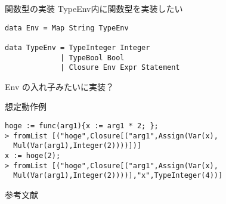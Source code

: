 \documentclass[uplatex,dvipdfmx,ja=standard]{beamer}
\begin{document}
\begin{frame}[fragile]{関数型の実装}
    TypeEnv内に関数型を実装したい
    \begin{verbatim}
data Env = Map String TypeEnv

data TypeEnv = TypeInteger Integer
             | TypeBool Bool
             | Closure Env Expr Statement
    \end{verbatim}
    Env の入れ子みたいに実装？

\end{frame}

\begin{frame}[fragile]{想定動作例}
    \begin{verbatim}
hoge := func(arg1){x := arg1 * 2; };
> fromList [("hoge",Closure[("arg1",Assign(Var(x),
  Mul(Var(arg1),Integer(2))))])]
x := hoge(2);
> fromList [("hoge",Closure[("arg1",Assign(Var(x),
  Mul(Var(arg1),Integer(2))))],"x",TypeInteger(4))]
    \end{verbatim}
\end{frame}

\begin{frame}{参考文献}

\end{frame}

%
\end{document}
